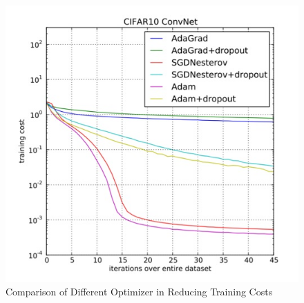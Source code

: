 \documentclass[twoside,11pt]{article}
\begin{document}
\begin{figure}[htbp]
\centering
\includegraphics[width=.8\textwidth]{figure3.jpg}
\caption{Comparison of Different Optimizer in Reducing Training Costs}
\label{figure1}
\end{figure}
\end{document}
